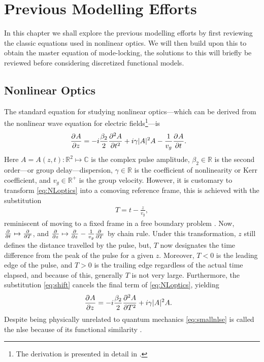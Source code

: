 
\chapter{Previous Modelling Efforts}
In this chapter we shall explore the previous modelling efforts by first reviewing the classic equations used in nonlinear optics. We will then build upon this to obtain the master equation of mode-locking, the solutions to this will briefly be reviewed before considering discretized functional models. \\

\section{Nonlinear Optics}
The standard equation for studying nonlinear optics---which can be derived from the nonlinear wave equation for electric fields\footnote{The derivation is presented in detail in \cite{agrawal2013, ferreira}.}---is
\begin{align}
\pdiff{A}{z} &= - i \frac{\beta_2}{2}\pdiff[2]{A}{t} + i \gamma |A|^2 A - \frac{1}{v_g} \pdiff{A}{t}.
\label{eq:NLoptics}
\end{align}
Here $A = A(z, t) : \mathbb{R}^2 \mapsto \mathbb{C}$ is the complex pulse amplitude, $\beta_2 \in \mathbb{R}$ is the second order---or group delay---dispersion, $\gamma \in \mathbb{R}$ is the coefficient of nonlinearity or Kerr coefficient, and $v_g \in \mathbb{R}^+$ is the group velocity. However, it is customary to transform \eqref{eq:NLoptics} into a comoving reference frame, this is achieved with the substitution
\begin{align}
\label{eq:shift}
T = t - \frac{z}{v_g},
\end{align}
reminiscent of moving to a fixed frame in a free boundary problem \cite{ockendon}. Now, $\frac{\partial^{}}{\partial{t}^{}} \mapsto \frac{\partial^{}}{\partial{T}^{}}$, and $\frac{\partial^{}}{\partial{z}^{}} \mapsto \frac{\partial^{}}{\partial{z}^{}} - \frac{1}{v_g} \frac{\partial^{}}{\partial{T}^{}}$ by chain rule.  Under this transformation, $z$ still defines the distance travelled by the pulse, but, $T$ now designates the time difference from the peak of the pulse for a given $z$. Moreover, $T < 0$ is the leading edge of the pulse, and $T > 0$ is the trailing edge regardless of the actual time elapsed, and because of this, generally $T$ is not very large. Furthermore, the substitution \eqref{eq:shift} cancels the final term of \eqref{eq:NLoptics}, yielding
\begin{align}
\pdiff{A}{z} &= - i \frac{\beta_2}{2}\pdiff[2]{A}{T} + i \gamma |A|^2 A.
\label{eq:smallnlse}
\end{align}
Despite being physically unrelated to quantum mechanics \eqref{eq:smallnlse} is called the \gls{nlse} because of its functional similarity \cite{agrawal2013, anderson, burgoyne2007, desurvire, ferreira, finot, rothenberg}. \\

